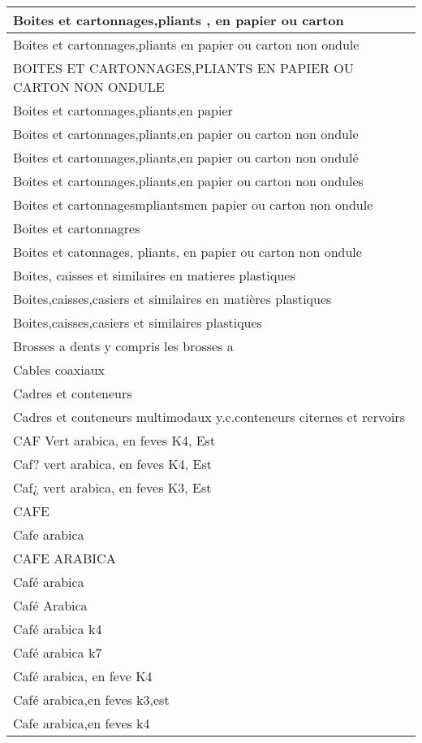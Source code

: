 \documentclass[
]{book}
\begin{document}
\begin{table}
\begin{tabular}[t]{l}
\hline
Boites et cartonnages,pliants , en papier ou carton\\
\hline
Boites et cartonnages,pliants en papier ou carton non ondule\\
\hline
BOITES ET CARTONNAGES,PLIANTS EN PAPIER OU CARTON NON ONDULE\\
\hline
Boites et cartonnages,pliants,en papier\\
\hline
Boites et cartonnages,pliants,en papier ou carton non ondule\\
\hline
Boites et cartonnages,pliants,en papier ou carton non ondulé\\
\hline
Boites et cartonnages,pliants,en papier ou carton non ondules\\
\hline
Boites et cartonnagesmpliantsmen papier ou carton non ondule\\
\hline
Boites et cartonnagres\\
\hline
Boites et catonnages, pliants, en papier ou carton non ondule\\
\hline
Boites, caisses et similaires en matieres plastiques\\
\hline
Boites,caisses,casiers et similaires en matières plastiques\\
\hline
Boites,caisses,casiers et similaires plastiques\\
\hline
Brosses a dents y compris les brosses a\\
\hline
Cables coaxiaux\\
\hline
Cadres et conteneurs\\
\hline
Cadres et conteneurs multimodaux y.c.conteneurs citernes et rervoirs\\
\hline
CAF Vert arabica, en feves K4, Est\\
\hline
Caf? vert arabica, en feves K4, Est\\
\hline
Caf¿ vert arabica, en feves K3, Est\\
\hline
CAFE\\
\hline
Cafe arabica\\
\hline
CAFE ARABICA\\
\hline
Café arabica\\
\hline
Café Arabica\\
\hline
Café arabica k4\\
\hline
Café arabica k7\\
\hline
Café arabica, en feve K4\\
\hline
Café arabica,en feves k3,est\\
\hline
Cafe arabica,en feves k4\\
\hline

\end{tabular}
\end{table}
\end{document}
